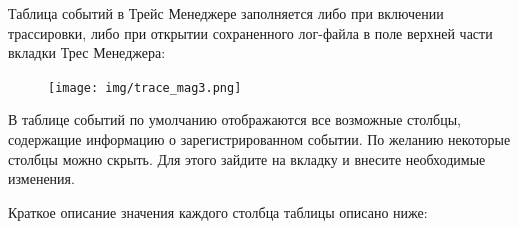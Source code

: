 
Таблица событий в Трейс Менеджере заполняется либо при включении трассировки, либо при открытии сохраненного лог-файла в поле верхней части вкладки Трес Менеджера: 

\begin{figure}[H]
	\centering
	\texttt{[image: img/trace\_mag3.png]}
\end{figure}

В таблице событий по умолчанию отображаются все возможные столбцы, содержащие информацию о зарегистрированном событии. По желанию некоторые столбцы можно скрыть. Для этого зайдите на вкладку  и внесите необходимые изменения.

Краткое описание значения каждого столбца таблицы описано ниже:

